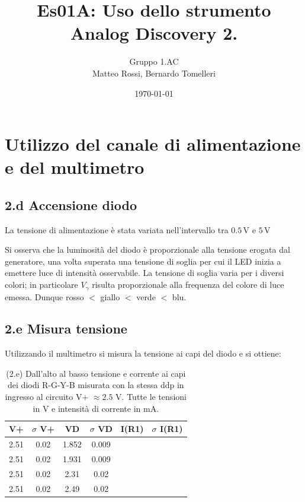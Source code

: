 \documentclass[10pt,a4paper]{article}
\author{Gruppo 1.AC \\ Matteo Rossi, Bernardo Tomelleri}
\title{Es01A: Uso dello strumento Analog Discovery 2.}
\newcommand{\exn}{\phantom{xxx}}
\begin{document}
\date{\today}
\maketitle

\setcounter{section}{1}

\section{Utilizzo del canale di alimentazione e del multimetro}

\subsection*{2.d Accensione diodo}

La tensione di alimentazione \`e stata variata nell'intervallo tra
$0.5\,\mathrm{V}$ e $5\,\mathrm{V}$


Si osserva che la luminosit\`a del diodo è proporzionale alla tensione
erogata dal generatore, una volta superata una tensione di soglia per cui
il LED inizia a emettere luce di intensità osservabile. La tensione di soglia
varia per i diversi colori; in particolare $V_\gamma$ risulta
proporzionale alla frequenza del colore di luce emessa. Dunque
rosso $<$ giallo $<$ verde $<$ blu.

\subsection*{2.e Misura tensione}
Utilizzando il multimetro si misura la tensione ai capi del diodo e si ottiene:

\begin{table}[htb]
\centering
\begin{tabular}{|c|c|c|c|c|c|}
\hline 
V+& $\sigma$ V+  & VD & $\sigma$ VD & I(R1)  & $\sigma$ I(R1) \\
\hline 
2.51 & 0.02 & 1.852 & 0.009 & \exn &\exn \\
2.51 & 0.02 & 1.931 & 0.009 & \exn &\exn \\
2.51 & 0.02 & 2.31 & 0.02 & \exn &\exn \\
2.51 & 0.02 & 2.49 & 0.02 & \exn &\exn \\
\hline 
\end{tabular} 
\caption{(2.e) Dall'alto al basso tensione e corrente ai capi dei diodi
R-G-Y-B misurata con la stessa ddp in ingresso al circuito V+ $\approx 2.5$ V.
Tutte le tensioni in V e intensità di corrente in mA.\label{tab:VD-ID}}
\end{table}
\end{document}
